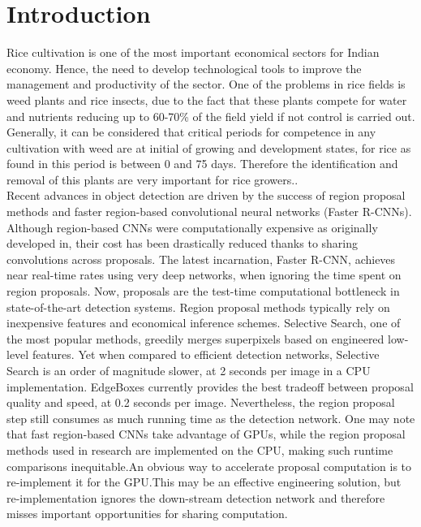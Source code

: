 \chapter{Introduction}\label{chap1}

Rice cultivation is one of the most important economical sectors for Indian economy. Hence, the need to develop technological tools to improve the management and productivity of the sector. One of the problems in rice fields is weed plants and rice insects, due to the fact that these plants compete for water and nutrients reducing up to 60-70\% of the field yield if not control is carried out. Generally, it can be considered that critical periods for competence in any cultivation with weed are at initial of growing and development states, for rice as found in this period is between 0 and 75 days. Therefore the identification and removal of this plants are very important for rice growers..\\

Recent advances in object detection are driven by the success of region proposal methods and faster region-based convolutional neural networks (Faster R-CNNs). Although region-based CNNs were computationally expensive as originally developed in, their cost has been drastically reduced thanks to sharing convolutions across proposals. The latest incarnation, Faster R-CNN, achieves near real-time rates using very deep networks, when ignoring the time spent on region proposals. Now, proposals are the test-time computational bottleneck in state-of-the-art detection systems. Region proposal methods typically rely on inexpensive features and economical inference schemes. Selective Search, one of the most popular methods, greedily merges superpixels based on engineered low-level features. Yet when compared to efficient detection networks, Selective Search is an order of magnitude slower, at 2 seconds per image in a CPU implementation. EdgeBoxes currently provides the best tradeoff between proposal quality and speed, at 0.2 seconds per image. Nevertheless, the region proposal step still consumes as much running time as the detection network. One may note that fast region-based CNNs take advantage of GPUs, while the region proposal methods used in research are implemented on the CPU, making such runtime comparisons inequitable.An obvious way to accelerate proposal computation is to re-implement it for the GPU.This may be an effective engineering solution, but re-implementation ignores the down-stream detection network and therefore misses important opportunities for sharing computation. \\

